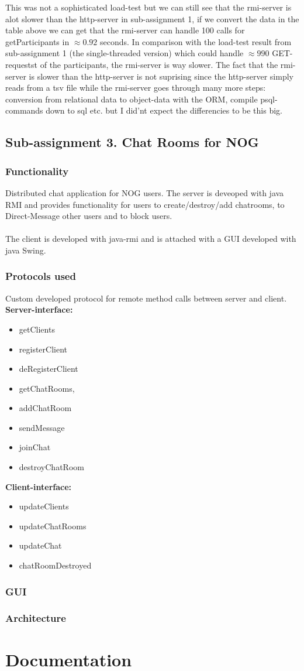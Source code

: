 \documentclass[a4paper, 11pt]{article}
\begin{document}
This was not a sophisticated load-test but we can still see that the rmi-server is alot slower than the http-server in sub-assignment 1, if we convert the data in the table above we can get that the rmi-server can handle 100 calls for getParticipants in $\approx 0.92$ seconds. In comparison with the load-test result from sub-assignment 1 (the single-threaded version) which could handle $\approx 990$ GET-requestst of the participants, the rmi-server is way slower. The fact that the rmi-server is slower than the http-server is not suprising since the http-server simply reads from a tsv file while the rmi-server goes through many more steps: conversion from relational data to object-data with the ORM, compile psql-commands down to sql etc. but I did'nt expect the differencies to be this big.
\subsection{Sub-assignment 3. Chat Rooms for NOG}
\subsubsection{Functionality}
Distributed chat application for NOG users.
The server is deveoped with java RMI and provides functionality for users to create/destroy/add chatrooms, to Direct-Message other users and to block users.
\\ \\The client is developed with java-rmi and is attached with a GUI developed with java Swing.
\subsubsection{Protocols used}
Custom developed protocol for remote method calls between server and client. \\
\textbf{Server-interface:}
\begin{itemize}
\item getClients
\item registerClient
\item deRegisterClient
\item getChatRooms,
\item addChatRoom
\item sendMessage
\item joinChat
\item destroyChatRoom
\end{itemize}
\textbf{Client-interface:}
\begin{itemize}
\item updateClients
\item updateChatRooms
\item updateChat
\item chatRoomDestroyed
\end{itemize}
\subsubsection{GUI}
\subsubsection{Architecture}
\section{Documentation}
\newpage
\nocite{*}


\end{document}
